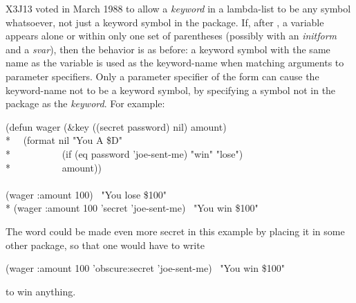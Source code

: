 \begin{newer}
X3J13 voted in March 1988 
to allow a {\it keyword} in a lambda-list
to be any symbol whatsoever, not just a keyword symbol
in the  package.  If, after ,
a variable appears alone or within only one set of parentheses
(possibly with an {\it initform} and a {\it svar}), then
the behavior is as before: a keyword symbol with the same name as
the variable is used as the keyword-name when matching arguments
to parameter specifiers.  Only a parameter specifier of the form
 can cause the keyword-name
not to be a keyword symbol, by specifying a symbol not in the 
package as the {\it keyword}.
For example:
\begin{lisp}
(defun wager (\&key ((secret password) nil) amount) \\*
~~(format nil "You {\Xtilde}A \${\Xtilde}D" \\*
~~~~~~~~~~(if (eq password 'joe-sent-me) "win" "lose") \\*
~~~~~~~~~~amount)) \\
\\
(wager :amount 100) \EV\ "You lose \$100" \\*
(wager :amount 100 'secret 'joe-sent-me) \EV\ "You win \$100"
\end{lisp}
The  word could be made even more secret in this example
by placing it in some other  package, so that one would
have to write
\begin{lisp}
(wager :amount 100 'obscure:secret 'joe-sent-me) \EV\ "You win \$100"
\end{lisp}
to win anything.
\end{newer}


